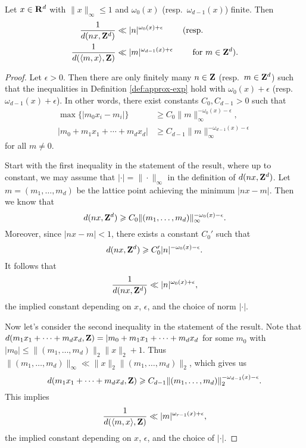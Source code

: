 \begin{lemma}\label{lem:bound-distance}
Let $x\in \mathbf{R}^d$ with $\|x\|_\infty\leqslant 1$ and $\omega_0(x)$ 
(resp.~$\omega_{d-1}(x)$) finite. Then 
\begin{align*}
	\frac{1}{d(n x,\mathbf{Z}^d)} 
		&\ll |n|^{\omega_0(x)+\epsilon}\qquad \text{ (resp.} \\
	\frac{1}{d(\langle m,x\rangle, \mathbf{Z})} 
		&\ll |m|^{\omega_{d-1}(x)+\epsilon} \qquad\text{ for $m\in \mathbf{Z}^d$).}
\end{align*}
\end{lemma}
\begin{proof}
Let $\epsilon>0$. Then there are only finitely many $n\in \mathbf{Z}$ 
(resp.~$m\in \mathbf{Z}^d$) such that the inequalities in Definition 
\ref{def:approx-exp} hold with $\omega_0(x)+\epsilon$ 
(resp.~$\omega_{d-1}(x)+\epsilon$). In other words, there exist constants 
$C_0, C_{d-1}>0$ such that 
\begin{align*}
	\max\{|m_0 x_i - m_i|\} 
		&\geqslant C_0 \|m\|_\infty^{-\omega_0(x)-\epsilon} ,\\
	|m_0 + m_1 x_1 + \cdots + m_d x_d| 
		&\geqslant C_{d-1} \|m\|_\infty^{-\omega_{d-1}(x)-\epsilon} 
\end{align*}
for all $m\ne 0$. 

Start with the first inequality in the statement of the result, where up to 
constant, we may assume that $|\cdot| = \|\cdot\|_\infty$ in the definition of 
$d(n x,\mathbf{Z}^d)$. Let $m=(m_1,\dots,m_d)$ be the lattice point achieving the 
minimum $|n x - m|$. Then we know that 
\[
	d(n x,\mathbf{Z}^d) \geqslant C_0 \|(m_1,\dots,m_d)\|_\infty^{-\omega_0(x)-\epsilon} .
\]
Moreover, since $|n x-m|<1$, there exists a constant $C_0'$ such that 
\[
	d(n x,\mathbf{Z}^d) \geqslant C_0' |n|^{-\omega_0(x)-\epsilon} .
\]
It follows that 
\[
	\frac{1}{d(n x,\mathbf{Z}^d)} \ll |n|^{\omega_0(x)+\epsilon} ,
\]
the implied constant depending on $x$, $\epsilon$, and the choice of norm 
$|\cdot|$. 

Now let's consider the second inequality in the statement of the result. Note 
that $d(m_1 x_1 + \dots + m_d x_d,\mathbf{Z}) = |m_0 + m_1x_1 + \cdots + m_d x_d$ for 
some $m_0$ with $|m_0| \leqslant \|(m_1,\dots,m_d)\|_2 \|x\|_2 + 1$. Thus 
$\|(m_1,\dots,m_d)\|_\infty \ll \|x\|_2 \|(m_1,\dots,m_d)\|_2$, which gives us 
\[
	d(m_1 x_1 + \cdots + m_d x_d,\mathbf{Z}) \geqslant C_{d-1} \|(m_1,\dots,m_d)\|_2^{-\omega_{d-1}(x)-\epsilon} .
\]
This implies 
\[
	\frac{1}{d(\langle m,x\rangle,\mathbf{Z})} \ll |m|^{\omega_{r-1}(x)+\epsilon} ,
\]
the implied constant depending on $x$, $\epsilon$, and the choice of $|\cdot|$. 
\end{proof}





